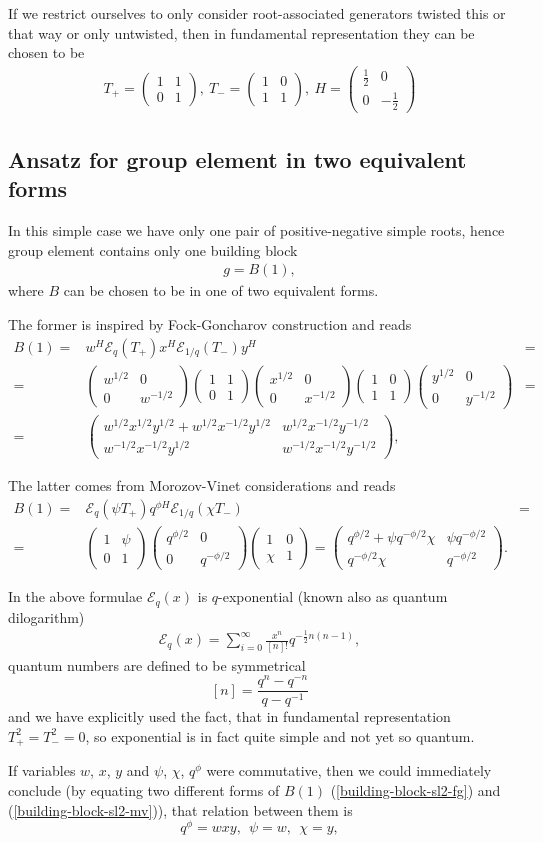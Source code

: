 \documentclass{article}
\newcommand{\lb}{\left (}
\newcommand{\rb}{\right )}
\newcommand{\be}{\begin{eqnarray}}
\newcommand{\ee}{\end{eqnarray}}
\newcommand {\?}{\textit{???}}
\newcommand{\me}[0]{\mathcal{E}}
\newcommand{\matd}[4]{\lb \begin{array}{cc}
#1 & #2 \\ #3 & #4
\end{array} \rb}
\newcommand{\delabel}[1]{(\ref{#1})}
\newcommand{\Honed}[1]{\lb \begin{array}{ccc}
#1^{1/2} & 0 \\ 0 & #1^{-1/2}
\end{array} \rb}
\newcommand{\Eoned}[1]{\lb \begin{array}{cc}
1 & #1 \\ 0 & 1
\end{array} \rb}
\newcommand{\Foned}[1]{\lb \begin{array}{cc}
1 & 0 \\ #1 & 1
\end{array} \rb}
\begin{document}
If we restrict ourselves to only consider root-associated generators twisted this or that way or only untwisted,
then in fundamental representation they can be chosen to be
\be
T_+ = \Eoned{1},\ T_- = \Foned{1},\ H = \matd{\frac{1}{2}}{0}{0}{-\frac{1}{2}}
\ee

\subsection{Ansatz for group element in two equivalent forms}
In this simple case we have only one pair of positive-negative simple roots, hence group
element contains only one building block
\be
g = B(1),
\ee
where $B$ can be chosen to be in one of two equivalent forms.

The former is inspired by Fock-Goncharov construction and reads
\be
\label{building-block-sl2-fg}
B(1) = & w^H \me_q \lb T_+\rb x^H \me_{1/q} \lb T_- \rb y^H & = \\
= & \Honed{w} \Eoned{1} \Honed{x} \Foned{1} \Honed{y} & = \nonumber \\
= & \matd{w^{1/2}x^{1/2}y^{1/2} + w^{1/2}x^{-1/2}y^{1/2}}{w^{1/2}x^{-1/2}y^{-1/2}}
{w^{-1/2}x^{-1/2}y^{1/2}}{w^{-1/2}x^{-1/2}y^{-1/2}} \nonumber,
\ee

The latter comes from Morozov-Vinet considerations and reads
\be
\label{building-block-sl2-mv}
B(1) = & \me_q \lb \psi T_+ \rb q^{\phi H} \me_{1/q} \lb \chi T_- \rb & = \\
= & \Eoned{\psi} \matd{q^{\phi/2}}{0}{0}{q^{-\phi/2}} \Foned{\chi} = \matd{q^{\phi/2} + \psi q^{-\phi/2}\chi}{\psi q^{-\phi/2}}{q^{-\phi/2}\chi}{q^{-\phi/2}} \nonumber.
\ee

In the above formulae $\me_q(x)$ is $q$-exponential (known also as quantum dilogarithm)
\be
\me_q(x) = \sum_{i = 0}^\infty \frac{x^n}{[n]!} q^{-\frac{1}{2}n(n-1)},
\ee
quantum numbers are defined to be symmetrical
$$[n] = \frac{q^n - q^{-n}}{q - q^{-1}}$$
and we have explicitly used the fact, that in fundamental representation $T_+^2 = T_-^2 = 0$,
so exponential is in fact quite simple and not yet so quantum.

If variables $w$, $x$, $y$ and $\psi$, $\chi$, $q^\phi$ were commutative, then we could immediately
conclude (by equating two different forms of $B(1)$ \delabel{building-block-sl2-fg} and \delabel{building-block-sl2-mv}),
 that relation between them is
\begin{equation}
  \boxed {
    q^\phi = w x y, \ \ \psi = w,\ \ \chi = y, \label{subs_suggest}
  }
\end{equation}
\end{document}
